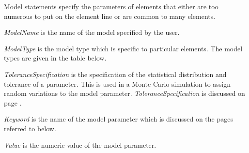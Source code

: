 %
%

Model statements specify the parameters of elements that either are
too numerous to put on the element line or are common to many elements.\\




\begin{widelist}
\item[{\it ModelName}] is the name of the model specified by the user.
\item[{\it ModelType}] is the model type which is specific to particular elements.
                       The model types are given in the table below.
\item[{\it ToleranceSpecification}] is the specification of the statistical
                     distribution and tolerance of a parameter.  This is used
             in a Monte Carlo simulation to assign random variations to
             the model parameter.
                     {\it ToleranceSpecification} is discussed on page
             \pageref{.MODELstatementTOL}.
\item[{\it Keyword}] is the name of the model parameter which is discussed on
                     the pages referred to below.
\item[{\it Value}] is the numeric value of the model parameter.
\end{widelist}


